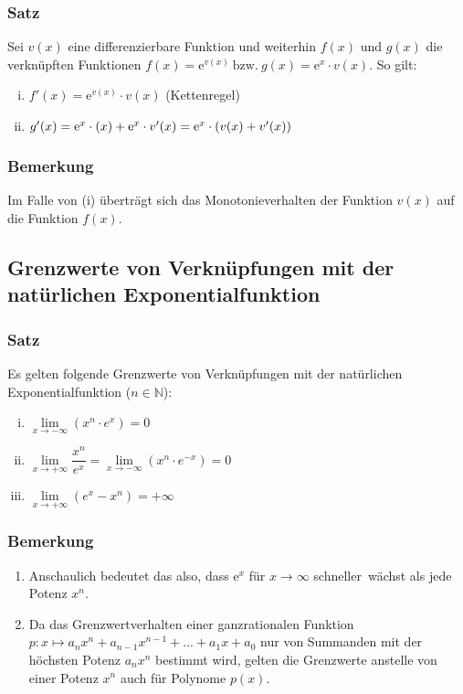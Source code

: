 \documentclass[a4paper,12pt]{article}
\newcommand{\N}{\mathbb{N}}
\newcommand{\e}{\mathrm{e}}
\begin{document}
\subsubsection{Satz}
Sei $v(x)$ eine differenzierbare Funktion und weiterhin $f(x)$ und $g(x)$ die verknüpften Funktionen $f(x)=\e^{v(x)} \ \text{bzw.} \ g(x)=\e^x \cdot v(x)$. So gilt:
\begin{enumerate}[(i)]
\item $f'(x)=\e^{v(x)}\cdot v(x)$ (Kettenregel)
\item $g'(x)=\e^x\cdot(x)+\e^x\cdot v'(x)=\e^x \cdot \mleft( v(x)+v'(x) \mright)$
\end{enumerate}

\subsubsection{Bemerkung}
Im Falle von (i) überträgt sich das Monotonieverhalten der Funktion $v(x)$ auf die Funktion $f(x)$. 

\subsection{Grenzwerte von Verknüpfungen mit der natürlichen Exponentialfunktion}
\subsubsection{Satz}
Es gelten folgende Grenzwerte von Verknüpfungen mit der natürlichen Exponentialfunktion ($n \in \N$):
\begin{enumerate}[(i)]
\item $\lim \limits_{x \rightarrow - \infty} (x^n\cdot e^x) = 0$
\item $\lim \limits_{x \rightarrow + \infty} \dfrac{x^n}{e^x} = \lim \limits_{x \rightarrow - \infty} (x^n\cdot e^{-x}) = 0$
\item $\lim \limits_{x \rightarrow + \infty} (e^x-x^n)=+ \infty$
\end{enumerate}

\subsubsection{Bemerkung}
\begin{enumerate}[(1)]
\item Anschaulich bedeutet das also, dass $\e^x$ für $x \rightarrow \infty$ \glqq schneller\grqq \ wächst als jede Potenz $x^n$.
\item Da das Grenzwertverhalten einer ganzrationalen Funktion $p: x \mapsto a_nx^n + a_{n-1}x^{n-1}+...+a_1x+a_0$ nur von Summanden mit der höchsten Potenz $a_nx^n$ bestimmt wird, gelten die Grenzwerte anstelle von einer Potenz $x^n$ auch für Polynome $p(x)$.
\end{enumerate}
\end{document}
